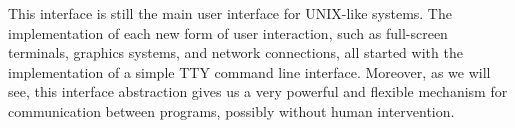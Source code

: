 This interface is still the main user interface for UNIX-like systems.
The implementation of each new form of user interaction, such as
full-screen terminals, graphics systems, and network connections, all
started with the implementation of a simple TTY command line interface.
Moreover, as we will see, this interface abstraction gives us a very
powerful and flexible mechanism for communication between programs,
possibly without human intervention.

